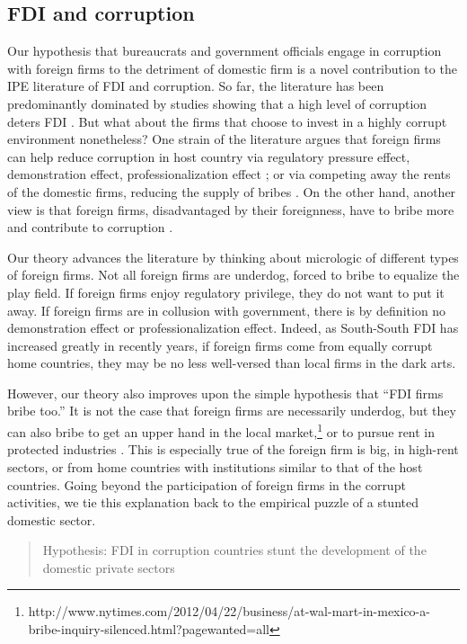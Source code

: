 \documentclass[12pt]{article}
\begin{document}
\subsection{FDI and corruption}

Our hypothesis that bureaucrats and government officials engage in corruption with foreign firms to the detriment of domestic firm is a novel contribution to the IPE literature of FDI and corruption. So far, the literature has been predominantly dominated by studies showing that a high level of corruption deters FDI \citep{Wei2000, Hakkala2008, Al-Sadig2009}. But what about the firms that choose to invest in a highly corrupt environment nonetheless? One strain of the literature argues that foreign firms can help reduce corruption in host country via regulatory pressure effect, demonstration effect, professionalization effect \citep{Kwok2006}; or via competing away the rents of the domestic firms, reducing the supply of bribes \citep{Sandholtz2003}. On the other hand, another view is that foreign firms, disadvantaged by their foreignness, have to bribe more and contribute to corruption \citep{Hellman2002}.

Our theory advances the literature by thinking about micrologic of different types of foreign firms. Not all foreign firms are underdog, forced to bribe to equalize the play field. If foreign firms enjoy regulatory privilege, they do not want to put it away. If foreign firms are in collusion with government, there is by definition no demonstration effect or professionalization effect. Indeed, as South-South FDI has increased greatly in recently years, if foreign firms come from equally corrupt home countries, they may be no less well-versed than local firms in the dark arts.

However, our theory also improves upon the simple hypothesis that ``FDI firms bribe too.'' It is not the case that foreign firms are necessarily underdog, but 
they can also bribe to get an upper hand in the local market,\footnote{http://www.nytimes.com/2012/04/22/business/at-wal-mart-in-mexico-a-bribe-inquiry-silenced.html?pagewanted=all} or to pursue rent in protected industries \citep{Malesky2015}. This is especially true of the foreign firm is big, in high-rent sectors, or from home countries with institutions similar to that of the host countries. Going beyond the participation of foreign firms in the corrupt activities, we tie this explanation back to the empirical puzzle of a stunted domestic sector.

\begin{quote}
Hypothesis: FDI in corruption countries stunt the development of the domestic private sectors
\end{quote}
\end{document}
